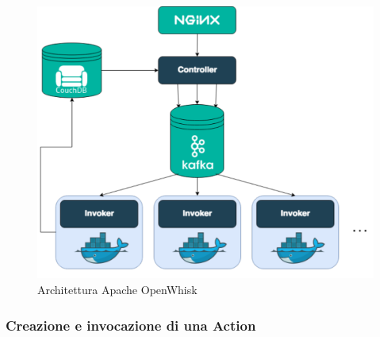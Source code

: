 \documentclass[12pt,a4paper,openany,twoside]{book}
\begin{document}
\begin{figure}[ht]
    \centering
    \includegraphics[width=\linewidth]{figures/OpenWhisk_schema.pdf}
    \caption{Architettura Apache OpenWhisk}
    \label{fig:architettura-apache-openWhisk}
\end{figure}

\subsubsection{Creazione e invocazione di una Action}
\end{document}
